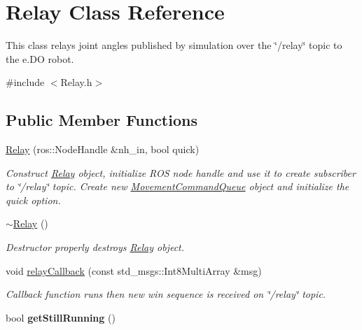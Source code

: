 \hypertarget{classRelay}{}\section{Relay Class Reference}
\label{classRelay}


This class relays joint angles published by simulation over the \char`\"{}/relay\char`\"{} topic to the e.\+DO robot.  




{\ttfamily \#include $<$Relay.\+h$>$}

\subsection*{Public Member Functions}
\begin{DoxyCompactItemize}
\item 
\hyperlink{classRelay_a857768551786a96926cf1bd05e59360b}{Relay} (ros\+::\+Node\+Handle \&nh\+\_\+in, bool quick)
\begin{DoxyCompactList}\small\item\em Construct \hyperlink{classRelay}{Relay} object, initialize R\+OS node handle and use it to create subscriber to \char`\"{}/relay\char`\"{} topic. Create new \hyperlink{classMovementCommandQueue}{Movement\+Command\+Queue} object and initialize the quick option. \end{DoxyCompactList}\item 
\hyperlink{classRelay_a858c668bc7e353db53ed07b1a4ef1dbd}{$\sim$\+Relay} ()
\begin{DoxyCompactList}\small\item\em Destructor properly destroys \hyperlink{classRelay}{Relay} object. \end{DoxyCompactList}\item 
void \hyperlink{classRelay_a68f2bb6574156f6b4446c9f91aa09b40}{relay\+Callback} (const std\+\_\+msgs\+::\+Int8\+Multi\+Array \&msg)
\begin{DoxyCompactList}\small\item\em Callback function runs then new win sequence is received on \char`\"{}/relay\char`\"{} topic. \end{DoxyCompactList}\item 
bool {\bfseries get\+Still\+Running} ()\hypertarget{classRelay_aeb51700fd2f6a316e9df5667618f8f85}{}\label{classRelay_aeb51700fd2f6a316e9df5667618f8f85}

\end{DoxyCompactItemize}


